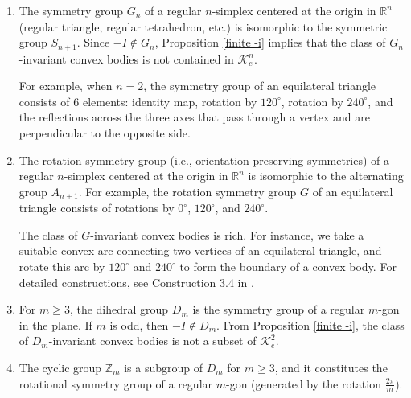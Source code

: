 \documentclass[12pt, reqno]{amsart}
\theoremstyle{definition}
\theoremstyle{remark}
\numberwithin{equation}{section}
\begin{document}
	
	\begin{enumerate}
		\item The symmetry group $G_n$ of a regular $n$-simplex centered at the origin in $\mathbb{R}^n$ 
		(regular triangle, regular tetrahedron, etc.) 
		is isomorphic to the symmetric group $S_{n+1}$. 
		Since $-I \notin G_n$,  Proposition \ref{finite -i} implies that  the class of $G_n$-invariant 
		convex bodies is not contained in $\mathcal{K}^n_e$. 
		
		For example, when $n=2$, the symmetry group of an equilateral triangle consists of 6 elements: identity map,
	rotation by $120^\circ$,
		 rotation by $240^\circ$, and the reflections across the three axes that pass through a vertex and are perpendicular to the opposite side.


		
		
		
		
		
		\item The rotation symmetry group (i.e., orientation-preserving symmetries) of a regular $n$-simplex centered at the origin in $\mathbb{R}^n$   is isomorphic to the alternating group $A_{n+1}$.
		For example, the rotation symmetry group $G$ of an equilateral triangle consists of rotations by $0^\circ$, $120^\circ$, and $240^\circ$.
		
		The class of $G$-invariant convex bodies is rich. For instance,  we take a suitable convex arc connecting two vertices of an equilateral triangle, and rotate this arc by $120^\circ$ and $240^\circ$ to form the boundary of a convex body. For detailed constructions, see Construction 3.4 in \cite{BKMZ group}.
		
		
	
		
		\item For  $m\ge3$, the dihedral group $D_{m}$ is the symmetry group of a regular $m$-gon in the plane. If $m$ is odd, then $-I\notin D_{m}$. From Proposition \ref{finite -i}, the class of $D_m$-invariant convex bodies is not a subset of $\mathcal{K}^2_e$.
		
		\item The cyclic group $\mathbb{Z}_m$ is a subgroup of $D_m$ for $m \geq 3$, and it constitutes the rotational symmetry group of a regular $m$-gon (generated by the rotation $\frac{2\pi}{m}$).
		

\end{enumerate}
\end{document}

